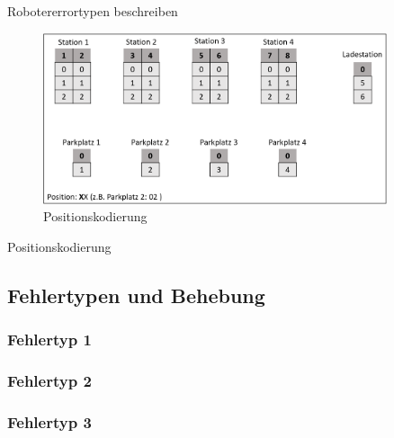 Robotererrortypen beschreiben

\begin{figure}[htb]
    \centering
    \includegraphics[width=0.9\textwidth]{Abbildungen/Positionskodierung.PNG}
    \caption{Positionskodierung}		
    \label{fig:Positionskodierung}
\end{figure}

Positionskodierung



\subsection{Fehlertypen und Behebung}
\label{sec:Error}

\subsubsection{Fehlertyp 1}
\subsubsection{Fehlertyp 2}
\subsubsection{Fehlertyp 3}
